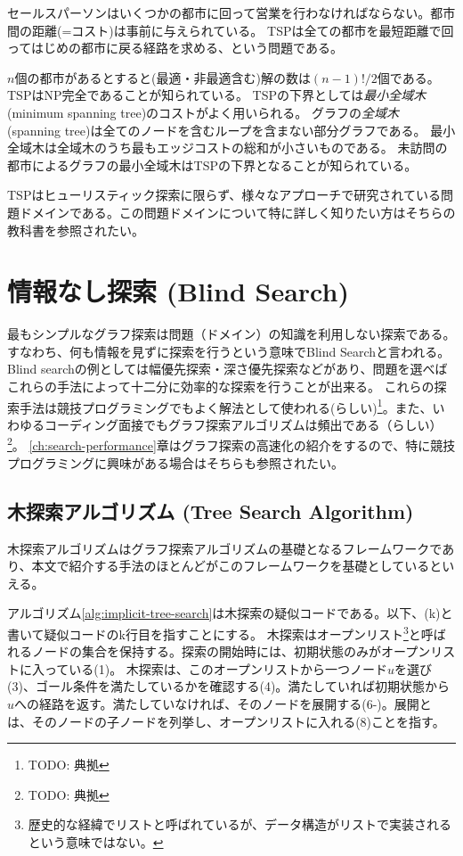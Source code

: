 \documentclass{report}
\begin{document}
セールスパーソンはいくつかの都市に回って営業を行わなければならない。都市間の距離(=コスト)は事前に与えられている。
TSPは全ての都市を最短距離で回ってはじめの都市に戻る経路を求める、という問題である。

$n$個の都市があるとすると(最適・非最適含む)解の数は$(n-1)!/2$個である。
TSPはNP完全であることが知られている。
TSPの下界としては{\it 最小全域木} (minimum spanning tree)のコストがよく用いられる。
グラフの{\it 全域木} (spanning tree)は全てのノードを含むループを含まない部分グラフである。
最小全域木は全域木のうち最もエッジコストの総和が小さいものである。
未訪問の都市によるグラフの最小全域木はTSPの下界となることが知られている。

TSPはヒューリスティック探索に限らず、様々なアプローチで研究されている問題ドメインである\cite{applegate2006traveling}。この問題ドメインについて特に詳しく知りたい方はそちらの教科書を参照されたい。


\chapter{情報なし探索 (Blind Search)}
\label{ch:blind-search}
最もシンプルなグラフ探索は問題（ドメイン）の知識を利用しない探索である。
すなわち、何も情報を見ずに探索を行うという意味でBlind Searchと言われる。
Blind searchの例としては幅優先探索・深さ優先探索などがあり、問題を選べばこれらの手法によって十二分に効率的な探索を行うことが出来る。
これらの探索手法は競技プログラミングでもよく解法として使われる(らしい)\footnote{TODO: 典拠}。また、いわゆるコーディング面接でもグラフ探索アルゴリズムは頻出である（らしい）\footnote{TODO: 典拠}。
\ref{ch:search-performance}章はグラフ探索の高速化の紹介をするので、特に競技プログラミングに興味がある場合はそちらも参照されたい。



\section{木探索アルゴリズム (Tree Search Algorithm)}
\label{sec:tree-search-algorithm}
木探索アルゴリズムはグラフ探索アルゴリズムの基礎となるフレームワークであり、本文で紹介する手法のほとんどがこのフレームワークを基礎としているといえる。

アルゴリズム\ref{alg:implicit-tree-search}は木探索の疑似コードである。以下、(k)と書いて疑似コードのk行目を指すことにする。
木探索はオープンリスト\footnote{歴史的な経緯でリストと呼ばれているが、データ構造がリストで実装されるという意味ではない。}と呼ばれるノードの集合を保持する。探索の開始時には、初期状態のみがオープンリストに入っている(1)。
木探索は、このオープンリストから一つノード$u$を選び(3)、ゴール条件を満たしているかを確認する(4)。満たしていれば初期状態から$u$への経路を返す。満たしていなければ、そのノードを展開する(6-)。展開とは、そのノードの子ノードを列挙し、オープンリストに入れる(8)ことを指す。
\end{document}

